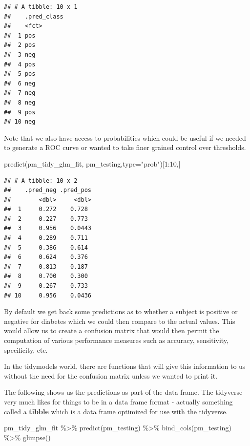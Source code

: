 \documentclass[
]{article}
\newenvironment{Shaded}{\begin{snugshade}}{\end{snugshade}}
\newcommand{\AttributeTok}[1]{\textcolor[rgb]{0.77,0.63,0.00}{#1}}
\newcommand{\DecValTok}[1]{\textcolor[rgb]{0.00,0.00,0.81}{#1}}
\newcommand{\FunctionTok}[1]{\textcolor[rgb]{0.00,0.00,0.00}{#1}}
\newcommand{\NormalTok}[1]{#1}
\newcommand{\SpecialCharTok}[1]{\textcolor[rgb]{0.00,0.00,0.00}{#1}}
\newcommand{\StringTok}[1]{\textcolor[rgb]{0.31,0.60,0.02}{#1}}
\begin{document}
\begin{verbatim}
## # A tibble: 10 x 1
##    .pred_class
##    <fct>      
##  1 pos        
##  2 pos        
##  3 neg        
##  4 pos        
##  5 pos        
##  6 neg        
##  7 neg        
##  8 neg        
##  9 pos        
## 10 neg
\end{verbatim}

Note that we also have access to probabilities which could be useful if
we needed to generate a ROC curve or wanted to take finer grained
control over thresholds.

\begin{Shaded}
\begin{Highlighting}[]
\FunctionTok{predict}\NormalTok{(pm\_tidy\_glm\_fit,}
\NormalTok{        pm\_testing,}\AttributeTok{type=}\StringTok{"prob"}\NormalTok{)[}\DecValTok{1}\SpecialCharTok{:}\DecValTok{10}\NormalTok{,]}
\end{Highlighting}
\end{Shaded}

\begin{verbatim}
## # A tibble: 10 x 2
##    .pred_neg .pred_pos
##        <dbl>     <dbl>
##  1     0.272    0.728 
##  2     0.227    0.773 
##  3     0.956    0.0443
##  4     0.289    0.711 
##  5     0.386    0.614 
##  6     0.624    0.376 
##  7     0.813    0.187 
##  8     0.700    0.300 
##  9     0.267    0.733 
## 10     0.956    0.0436
\end{verbatim}

By default we get back some predictions as to whether a subject is
positive or negative for diabetes which we could then compare to the
actual values. This would allow us to create a confusion matrix that
would then permit the computation of various performance measures such
as accuracy, sensitivity, specificity, etc.

In the tidymodels world, there are functions that will give this
information to us without the need for the confusion matrix unless we
wanted to print it.

The following shows us the predictions as part of the data frame. The
tidyverse very much likes for things to be in a data frame format -
actually something called a \textbf{tibble} which is a data frame
optimized for use with the tidyverse.

\begin{Shaded}
\begin{Highlighting}[]
\NormalTok{pm\_tidy\_glm\_fit }\SpecialCharTok{\%\textgreater{}\%}
  \FunctionTok{predict}\NormalTok{(pm\_testing) }\SpecialCharTok{\%\textgreater{}\%}
  \FunctionTok{bind\_cols}\NormalTok{(pm\_testing) }\SpecialCharTok{\%\textgreater{}\%}
  \FunctionTok{glimpse}\NormalTok{()}
\end{Highlighting}
\end{Shaded}
\end{document}
